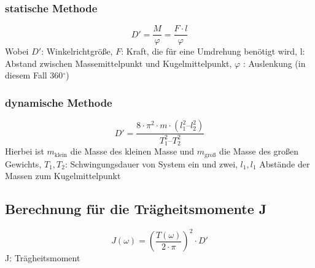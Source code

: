 \documentclass[fontsize=12pt]{scrartcl}
\begin{document}
\subsubsection{statische Methode} 
\begin{equation}
 D'=\frac{M}{\varphi}= \frac{F \cdot l}{\varphi}
\end{equation}
Wobei $D'$: Winkelrichtgröße, $F$: Kraft, die für eine Umdrehung benötigt wird, l: Abstand zwischen Massemittelpunkt und Kugelmittelpunkt, $\varphi$ : Auslenkung (in diesem Fall 360$^\circ$)
\subsubsection{dynamische Methode}
\begin{equation}
D'=\frac{8 \cdot \pi^2 \cdot m \cdot (l_1^2 – l_2^2)}{T_1^2 – T_2^2}
\end{equation}
Hierbei ist $m_{\text{klein}}$ die Masse des kleinen Masse und  $m_{\text{groß}}$ die Masse des großen Gewichts, $T_1, T_2$: Schwingungsdauer von System ein und zwei, $l_1,l_1$ Abstände der Massen zum Kugelmittelpunkt
\subsection{Berechnung für die Trägheitsmomente J}
\begin{equation}
J(\omega)=\left ( \frac{T(\omega)}{2 \cdot \pi }\right)^2 \cdot D'
\end{equation}
J: Trägheitsmoment

\newpage
\end{document}
